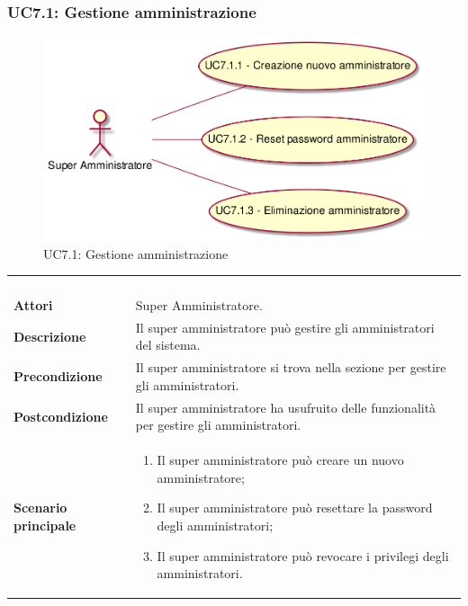 \newpage\subsubsection{UC7.1: Gestione amministrazione}
\label{UC7.1}
\begin{figure}[h]
\centering
\includegraphics[width=\textwidth,height=\textheight,keepaspectratio]{images/UseCaseUC71.png}
\caption{UC7.1: Gestione amministrazione}
\end{figure}
\begin{longtable}{l|p{10cm}}
\rowcolor[gray]{0.8} \multicolumn{2}{c}{} \\
\rowcolor[gray]{0.8} \multicolumn{2}{c}{\textbf{UC7.1 - Gestione amministrazione}} \\
\rowcolor[gray]{0.8} \multicolumn{2}{c}{} \\
\hline
&\\
\textbf{Attori} & Super Amministratore.\\[7pt]
\textbf{Descrizione} & Il super amministratore può gestire gli amministratori del sistema.\\[7pt]
\textbf{Precondizione} & Il super amministratore si trova nella sezione per gestire gli amministratori.\\[7pt]
\textbf{Postcondizione} & Il super amministratore ha usufruito delle funzionalità per gestire gli amministratori.\\[7pt]
\textbf{Scenario principale} &\begin{enumerate}
\item  Il super amministratore può creare un nuovo amministratore;
\item  Il super amministratore può resettare la password degli amministratori;
\item  Il super amministratore può revocare i privilegi degli amministratori.
\end{enumerate}
\\[7pt]\hline
\end{longtable}

